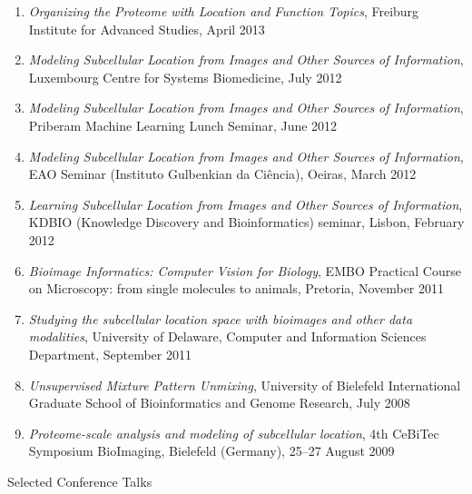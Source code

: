 \documentclass{article}
\renewcommand\subsection[1]{%
    \par\vspace{.1em}%
    {\hspace{1em}\subsubhead #1}%
    \par\vspace{.2em}%
}
\begin{document}
\begin{enumerate}
{Applications}, European Bioimage Analysis Symposium, Barcelona, October 2013
\item \emph{Organizing the Proteome with Location and Function Topics},
Freiburg Institute for Advanced Studies, April 2013
\item \emph{Modeling Subcellular Location from Images and Other Sources of
Information}, Luxembourg Centre for Systems Biomedicine, July 2012
\item \emph{Modeling Subcellular Location from Images and Other Sources of
Information}, Priberam Machine Learning Lunch Seminar, June 2012
\item \emph{Modeling Subcellular Location from Images and Other Sources of
Information}, EAO Seminar (Instituto Gulbenkian da Ciência), Oeiras, March 2012
\item \emph{Learning Subcellular Location from Images and Other Sources of
Information}, KDBIO (Knowledge Discovery and Bioinformatics) seminar, Lisbon,
February 2012
\item \emph{Bioimage Informatics: Computer Vision for Biology}, EMBO Practical
Course on Microscopy: from single molecules to animals, Pretoria, November 2011
\item \emph{Studying the subcellular location space with bioimages and other
data modalities}, University of Delaware, Computer and Information Sciences
Department, September 2011
\item \emph{Unsupervised Mixture Pattern Unmixing}, University of Bielefeld
International Graduate School of Bioinformatics and Genome Research, July 2008
\item \emph{Proteome-scale analysis and modeling of subcellular location}, 4th
CeBiTec Symposium BioImaging, Bielefeld (Germany), 25--27 August 2009
\end{enumerate}

\subsection{Selected Conference Talks}
\end{document}
